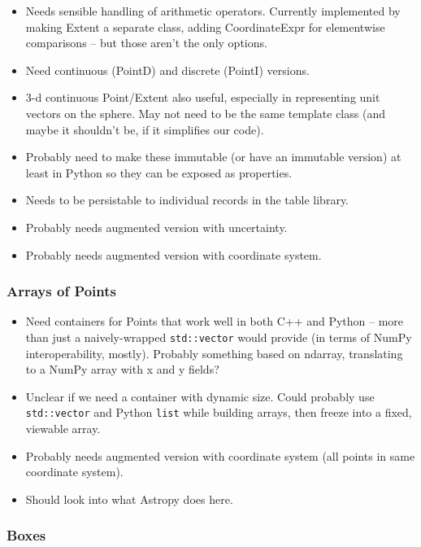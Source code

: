 \begin{itemize}
\item Needs sensible handling of arithmetic operators.  Currently implemented by making Extent a separate class, adding CoordinateExpr for elementwise comparisons -- but those aren't the only options.
\item Need continuous (PointD) and discrete (PointI) versions.
\item 3-d continuous Point/Extent also useful, especially in representing unit vectors on the sphere.  May not need to be the same template class (and maybe it shouldn't be, if it simplifies our code).
\item Probably need to make these immutable (or have an immutable version) at least in Python so they can be exposed as properties.
\item Needs to be persistable to individual records in the table library.
\item Probably needs augmented version with uncertainty.
\item Probably needs augmented version with coordinate system.
\end{itemize}

\subsubsection{Arrays of Points}
\label{sec:spCartesianPointArrays}

\begin{itemize}
\item Need containers for Points that work well in both C++ and Python -- more than just a naively-wrapped \texttt{std::vector} would provide (in terms of NumPy interoperability, mostly).  Probably something based on ndarray, translating to a NumPy array with x and y fields?
\item Unclear if we need a container with dynamic size.  Could probably use \texttt{std::vector} and Python \texttt{list} while building arrays, then freeze into a fixed, viewable array.
\item Probably needs augmented version with coordinate system (all points in same coordinate system).
\item Should look into what Astropy does here.
\end{itemize}

\subsubsection{Boxes}
\label{sec:spCartesianBoxes}

